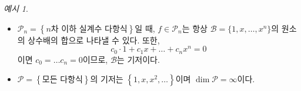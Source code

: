 \documentclass[unfonts,oneside,a4paper]{oblivoir}
\theoremstyle{definition}
\theoremstyle{theorem}
\theoremstyle{theorem}
\theoremstyle{remark}
\theoremstyle{remark}
\theoremstyle{remark}
\newtheorem*{example}{예시}
\theoremstyle{remark}
\begin{document}
\begin{example}
    \leavevmode
    \begin{itemize}
        \item $\mathcal P_n = \left\{n\text{차 이하 실계수 다항식}\right\}$일 때, $f \in \mathcal P_n$는 항상 $\mathcal B = \{1, x, \dots, x^n\}$의 원소의 상수배의 합으로 나타낼 수 있다.
            또한,
            \[
                c_0 \cdot 1 + c_1 x + \dots + c_n x^n = 0
            \]
            이면 $c_0 = \dots c_n = 0$이므로, $\mathcal B$는 기저이다.
        \item $\mathcal P = \left\{\text{모든 다항식}\right\}$의 기저는 $\left\{1, x, x^2, \dots\right\}$이며 $\dim \mathcal{P} = \infty$이다.
    \end{itemize}
\end{example}
\end{document}
